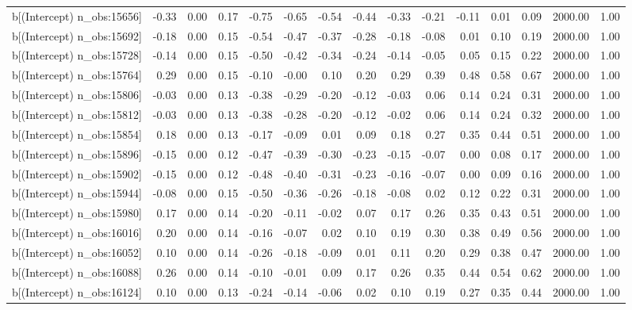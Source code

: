 \begin{table}[ht]
\begin{tabular}{rrrrrrrrrrrrrrr}
  b[(Intercept) n\_obs:15656] & -0.33 & 0.00 & 0.17 & -0.75 & -0.65 & -0.54 & -0.44 & -0.33 & -0.21 & -0.11 & 0.01 & 0.09 & 2000.00 & 1.00 \\ 
  b[(Intercept) n\_obs:15692] & -0.18 & 0.00 & 0.15 & -0.54 & -0.47 & -0.37 & -0.28 & -0.18 & -0.08 & 0.01 & 0.10 & 0.19 & 2000.00 & 1.00 \\ 
  b[(Intercept) n\_obs:15728] & -0.14 & 0.00 & 0.15 & -0.50 & -0.42 & -0.34 & -0.24 & -0.14 & -0.05 & 0.05 & 0.15 & 0.22 & 2000.00 & 1.00 \\ 
  b[(Intercept) n\_obs:15764] & 0.29 & 0.00 & 0.15 & -0.10 & -0.00 & 0.10 & 0.20 & 0.29 & 0.39 & 0.48 & 0.58 & 0.67 & 2000.00 & 1.00 \\ 
  b[(Intercept) n\_obs:15806] & -0.03 & 0.00 & 0.13 & -0.38 & -0.29 & -0.20 & -0.12 & -0.03 & 0.06 & 0.14 & 0.24 & 0.31 & 2000.00 & 1.00 \\ 
  b[(Intercept) n\_obs:15812] & -0.03 & 0.00 & 0.13 & -0.38 & -0.28 & -0.20 & -0.12 & -0.02 & 0.06 & 0.14 & 0.24 & 0.32 & 2000.00 & 1.00 \\ 
  b[(Intercept) n\_obs:15854] & 0.18 & 0.00 & 0.13 & -0.17 & -0.09 & 0.01 & 0.09 & 0.18 & 0.27 & 0.35 & 0.44 & 0.51 & 2000.00 & 1.00 \\ 
  b[(Intercept) n\_obs:15896] & -0.15 & 0.00 & 0.12 & -0.47 & -0.39 & -0.30 & -0.23 & -0.15 & -0.07 & 0.00 & 0.08 & 0.17 & 2000.00 & 1.00 \\ 
  b[(Intercept) n\_obs:15902] & -0.15 & 0.00 & 0.12 & -0.48 & -0.40 & -0.31 & -0.23 & -0.16 & -0.07 & 0.00 & 0.09 & 0.16 & 2000.00 & 1.00 \\ 
  b[(Intercept) n\_obs:15944] & -0.08 & 0.00 & 0.15 & -0.50 & -0.36 & -0.26 & -0.18 & -0.08 & 0.02 & 0.12 & 0.22 & 0.31 & 2000.00 & 1.00 \\ 
  b[(Intercept) n\_obs:15980] & 0.17 & 0.00 & 0.14 & -0.20 & -0.11 & -0.02 & 0.07 & 0.17 & 0.26 & 0.35 & 0.43 & 0.51 & 2000.00 & 1.00 \\ 
  b[(Intercept) n\_obs:16016] & 0.20 & 0.00 & 0.14 & -0.16 & -0.07 & 0.02 & 0.10 & 0.19 & 0.30 & 0.38 & 0.49 & 0.56 & 2000.00 & 1.00 \\ 
  b[(Intercept) n\_obs:16052] & 0.10 & 0.00 & 0.14 & -0.26 & -0.18 & -0.09 & 0.01 & 0.11 & 0.20 & 0.29 & 0.38 & 0.47 & 2000.00 & 1.00 \\ 
  b[(Intercept) n\_obs:16088] & 0.26 & 0.00 & 0.14 & -0.10 & -0.01 & 0.09 & 0.17 & 0.26 & 0.35 & 0.44 & 0.54 & 0.62 & 2000.00 & 1.00 \\ 
  b[(Intercept) n\_obs:16124] & 0.10 & 0.00 & 0.13 & -0.24 & -0.14 & -0.06 & 0.02 & 0.10 & 0.19 & 0.27 & 0.35 & 0.44 & 2000.00 & 1.00 \\ 

\end{tabular}
\end{table}
